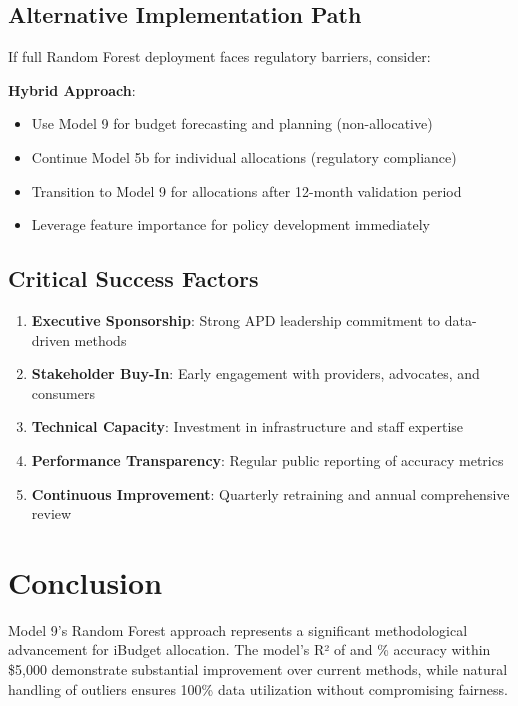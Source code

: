 \subsection{Alternative Implementation Path}

If full Random Forest deployment faces regulatory barriers, consider:

\textbf{Hybrid Approach}:
\begin{itemize}
    \item Use Model 9 for budget forecasting and planning (non-allocative)
    \item Continue Model 5b for individual allocations (regulatory compliance)
    \item Transition to Model 9 for allocations after 12-month validation period
    \item Leverage feature importance for policy development immediately
\end{itemize}

\subsection{Critical Success Factors}

\begin{enumerate}
    \item \textbf{Executive Sponsorship}: Strong APD leadership commitment to data-driven methods
    \item \textbf{Stakeholder Buy-In}: Early engagement with providers, advocates, and consumers
    \item \textbf{Technical Capacity}: Investment in infrastructure and staff expertise
    \item \textbf{Performance Transparency}: Regular public reporting of accuracy metrics
    \item \textbf{Continuous Improvement}: Quarterly retraining and annual comprehensive review
\end{enumerate}

\section{Conclusion}

Model 9's Random Forest approach represents a significant methodological advancement for iBudget allocation. The model's R² of \ModelNineRSquaredTest{} and \ModelNineWithinFiveK{}\% accuracy within \$5,000 demonstrate substantial improvement over current methods, while natural handling of outliers ensures 100\% data utilization without compromising fairness.

